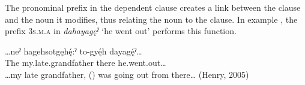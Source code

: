 The pronominal prefix in the dependent clause creates a link between the clause and the noun it modifies, thus relating the noun to the clause. In example , the prefix  \textsc{3s.m.a} in \textit{dahayagęˀ} ‘he went out’ performs this function.

\ea\label{ex:relp}
 \gll …neˀ hagehsotgęhę́:ˀ to-gyę́h dayagę́ˀ…\\
The my.late.grandfather there he.went.out…\\
\glt …my late grandfather, () was going out from there… (Henry, 2005)
\z

